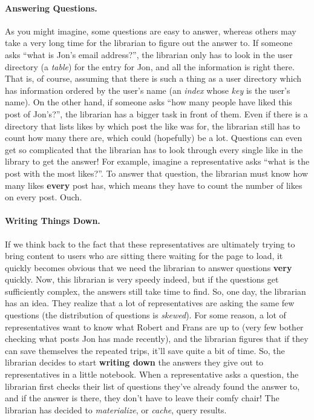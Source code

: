 \paragraph{Answering Questions.}
%
As you might imagine, some questions are easy to answer, whereas others may take
a very long time for the librarian to figure out the answer to. If someone asks
``what is Jon's email address?'', the librarian only has to look in the user
directory (a \textit{table}) for the entry for Jon, and all the information is
right there. That is, of course, assuming that there is such a thing as a user
directory which has information ordered by the user's name (an \textit{index}
whose \textit{key} is the user's name). On the other hand, if someone asks ``how
many people have liked this post of Jon's?'', the librarian has a bigger task in
front of them. Even if there is a directory that lists likes by which post the
like was for, the librarian still has to count how many there are, which could
(hopefully) be a lot. Questions can even get so complicated that the librarian
has to look through every single like in the library to get the answer! For
example, imagine a representative asks ``what is the post with the most
likes?''. To answer that question, the librarian must know how many likes
\textbf{every} post has, which means they have to count the number of likes on
every post. Ouch.

\paragraph{Writing Things Down.}
%
If we think back to the fact that these representatives are ultimately trying to
bring content to users who are sitting there waiting for the page to load, it
quickly becomes obvious that we need the librarian to answer questions
\textbf{very} quickly. Now, this librarian is very speedy indeed, but if the
questions get sufficiently complex, the answers still take time to find. So, one
day, the librarian has an idea. They realize that a lot of representatives are
asking the same few questions (the distribution of questions is
\textit{skewed}). For some reason, a lot of representatives want to know what
Robert and Frans are up to (very few bother checking what posts Jon has made
recently), and the librarian figures that if they can save themselves the
repeated trips, it'll save quite a bit of time. So, the librarian decides to
start \textbf{writing down} the answers they give out to representatives in a
little notebook. When a representative asks a question, the librarian first
checks their list of questions they've already found the answer to, and if the
answer is there, they don't have to leave their comfy chair! The librarian has
decided to \textit{materialize}, or \textit{cache}, query results.

